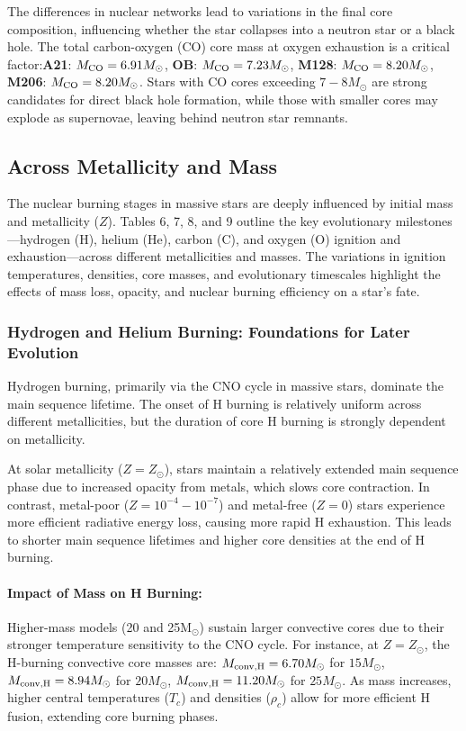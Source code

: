 The differences in nuclear networks lead to variations in the final core composition, influencing whether the star collapses into a neutron star or a black hole. The total carbon-oxygen (CO) core mass at oxygen exhaustion is a critical factor:\textbf{A21}: $M_{\rm CO} = 6.91 M_\odot$, \textbf{OB}: $M_{\rm CO} = 7.23 M_\odot$, \textbf{M128}: $M_{\rm CO} = 8.20 M_\odot$, \textbf{M206}: $M_{\rm CO} = 8.20 M_\odot$. Stars with CO cores exceeding $7-8 M_\odot$ are strong candidates for direct black hole formation, while those with smaller cores may explode as supernovae, leaving behind neutron star remnants.


\subsection{Across Metallicity and Mass}

The nuclear burning stages in massive stars are deeply influenced by initial mass and metallicity ($Z$). Tables 6, 7, 8, and 9 outline the key evolutionary milestones—hydrogen (H), helium (He), carbon (C), and oxygen (O) ignition and exhaustion—across different metallicities and masses. The variations in ignition temperatures, densities, core masses, and evolutionary timescales highlight the effects of mass loss, opacity, and nuclear burning efficiency on a star’s fate. 

\subsubsection{Hydrogen and Helium Burning: Foundations for Later Evolution}

Hydrogen burning, primarily via the CNO cycle in massive stars, dominate the main sequence lifetime. The onset of H burning is relatively uniform across different metallicities, but the duration of core H burning is strongly dependent on metallicity.

At solar metallicity ($Z = Z_\odot$), stars maintain a relatively extended main sequence phase due to increased opacity from metals, which slows core contraction. In contrast, metal-poor ($Z = 10^{-4} - 10^{-7}$) and metal-free ($Z = 0$) stars experience more efficient radiative energy loss, causing more rapid H exhaustion. This leads to shorter main sequence lifetimes and higher core densities at the end of H burning.

\paragraph{Impact of Mass on H Burning:}
Higher-mass models (20 and 25M$_\odot$) sustain larger convective cores due to their stronger temperature sensitivity to the CNO cycle. For instance, at $Z = Z_\odot$, the H-burning convective core masses are: $M_{\rm conv, H} = 6.70 M_\odot$ for $15 M_\odot$, $M_{\rm conv, H} = 8.94 M_\odot$ for $20 M_\odot$, $M_{\rm conv, H} = 11.20 M_\odot$ for $25 M_\odot$. As mass increases, higher central temperatures ($T_c$) and densities ($\rho_c$) allow for more efficient H fusion, extending core burning phases.

